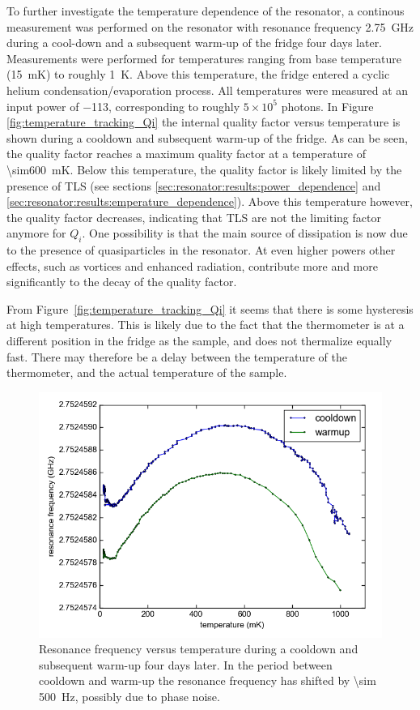 \documentclass[12pt]{report}
\begin{document}
To further investigate the temperature dependence of the resonator, a continous measurement was performed on the resonator with resonance frequency \SI{2.75}{\giga \hertz} during a cool-down and a subsequent warm-up of the fridge four days later. Measurements were performed for temperatures ranging from base temperature (\SI{15}{\milli \kelvin}) to roughly \SI{1}{\kelvin}. Above this temperature, the fridge entered a cyclic helium condensation/evaporation process. All temperatures were measured at an input power of \SI{-113}{\dBm}, corresponding to roughly $5 \times 10^5$ photons. In Figure \ref{fig:temperature_tracking_Qi} the internal quality factor versus temperature is shown during a cooldown and subsequent warm-up of the fridge. As can be seen, the quality factor reaches a maximum quality factor at a temperature of \SI{\sim600}{\milli \kelvin}. Below this temperature, the quality factor is likely limited by the presence of TLS (see sections \ref{sec:resonator:results:power_dependence} and \ref{sec:resonator:results:emperature_dependence}). Above this temperature however, the quality factor decreases, indicating that TLS are not the limiting factor anymore for $Q_i$. One possibility is that the main source of dissipation is now due to the presence of quasiparticles in the resonator. At even higher powers other effects, such as vortices and enhanced radiation, contribute more and more significantly to the decay of the quality factor.

From Figure~\ref{fig:temperature_tracking_Qi} it seems that there is some hysteresis at high temperatures. This is likely due to the fact that the thermometer is at a different position in the fridge as the sample, and does not thermalize equally fast. There may therefore be a delay between the temperature of the thermometer, and the actual temperature of the sample.

\begin{figure}[h]
    \centering
    \includegraphics[width=.7\textwidth]{Figures/Temperature tracking - f0 vs T.png}
    \caption{Resonance frequency versus temperature during a cooldown and subsequent warm-up four days later. In the period between cooldown and warm-up the resonance frequency has shifted by \SI{\sim 500}{\hertz}, possibly due to phase noise.}
    \label{fig:temperature_tracking_f0}
\end{figure}
\end{document}

